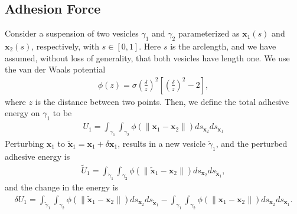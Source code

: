 \documentclass[%
preprint,
 amsmath,amssymb,
 aps,
]{revtex4-1}
\newcommand{\xx}{\mathbf{x}}
\begin{document}
\begin{appendices}
\section{Adhesion Force}
\label{sec:appendixA}
Consider a suspension of two vesicles $\gamma_1$ and $\gamma_2$
parameterized as $\xx_1(s)$ and $\xx_2(s)$, respectively, with $s \in
[0,1]$.  Here $s$ is the arclength, and we have assumed, without loss of
generality, that both vesicles have length one.  We use the van der
Waals potential
\begin{align*}
  \phi(z) = \sigma\left(\frac{\delta}{z}\right)^2 \left[ 
    \left(\frac{\delta}{z}\right)^2 - 2 \right],
\end{align*}
where $z$ is the distance between two points.  Then, we define the total
adhesive energy on $\gamma_1$ to be
\begin{align*}
  U_1 = \int_{\gamma_1} \int_{\gamma_2} \phi(\|\xx_1 - \xx_2\|) 
    ds_{\xx_2} ds_{\xx_1}
\end{align*}
Perturbing $\xx_1$ to $\tilde{\xx}_1 = \xx_1 +  \delta \xx_1$, results
in a new vesicle $\tilde{\gamma}_1$, and the perturbed adhesive energy
is
\begin{align*}
  \widetilde{U}_1 = \int_{\tilde{\gamma}_1} \int_{\gamma_2}
  \phi(\|\tilde{\xx}_1 - \xx_2\|) ds_{\xx_2} ds_{\tilde{\xx}_1},
\end{align*}
and the change in the energy is
\begin{align*}
  \delta U_1 = \int_{\tilde{\gamma}_1} \int_{\gamma_2}
  \phi(\|\tilde{\xx}_1 - \xx_2\|) ds_{\xx_2} ds_{\tilde{\xx}_1} - 
  \int_{\gamma_1} \int_{\gamma_2} \phi(\|\xx_1 - \xx_2\|) 
  ds_{\xx_2} ds_{\xx_1}.
\end{align*}


\end{appendices}
\end{document}
